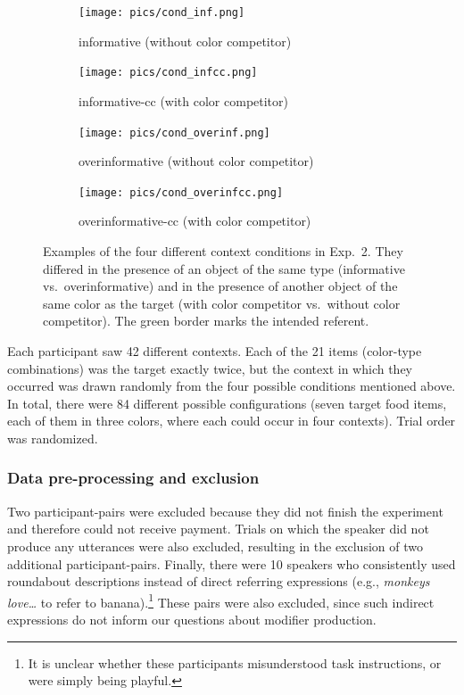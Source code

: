 \documentclass[11pt]{article}
\begin{document}
\begin{figure}[bt!]
	\begin{subfigure}{.5\textwidth}
		\centering
		\texttt{[image: pics/cond\_inf.png]}
		\caption{informative (without color competitor)}
		\label{fig:condInf}
	\end{subfigure}
	\begin{subfigure}{.5\textwidth}
		\centering
		\texttt{[image: pics/cond\_infcc.png]}
		\centering
		\caption{informative-cc (with color competitor)}
		\label{fig:condInfcc}
	\end{subfigure}
	\begin{subfigure}{.5\textwidth}
		\centering
		\texttt{[image: pics/cond\_overinf.png]}
		\caption{overinformative (without color competitor)}
		\label{fig:condOverinf}
	\end{subfigure}
	\begin{subfigure}{.5\textwidth}
		\centering
		\texttt{[image: pics/cond\_overinfcc.png]}
		\centering
		\caption{overinformative-cc (with color competitor)}
		\label{fig:condOverinfcc}
	\end{subfigure}
	\caption{Examples of the four different context conditions in Exp.~2. They differed in the presence of an object of the same type (informative vs.~overinformative) and in the presence of another object of the same color as the target (with color competitor vs.~without color competitor). The green border marks the intended referent.}
	\label{fig:conditions}
\end{figure}

Each participant saw 42 different contexts. Each of the 21 items (color-type combinations) was the target exactly twice, but the context in which they occurred was drawn randomly from the four possible conditions mentioned above. In total, there were 84 different possible configurations (seven target food items, each of them in three colors, where each could occur in four contexts). Trial order was randomized.


\subsubsection{Data pre-processing and exclusion}

Two participant-pairs were excluded because they did not finish the experiment and therefore could not receive payment. Trials on which the speaker did not produce any utterances were also excluded, resulting in the exclusion of two additional participant-pairs.
Finally, there were 10 speakers who consistently used roundabout descriptions instead of direct referring expressions (e.g., \emph{monkeys love\dots} to refer to banana).\footnote{It is unclear whether these participants misunderstood task instructions, or were simply being playful.} These pairs were also excluded, since such indirect expressions do not inform our questions about modifier production.
\end{document}
